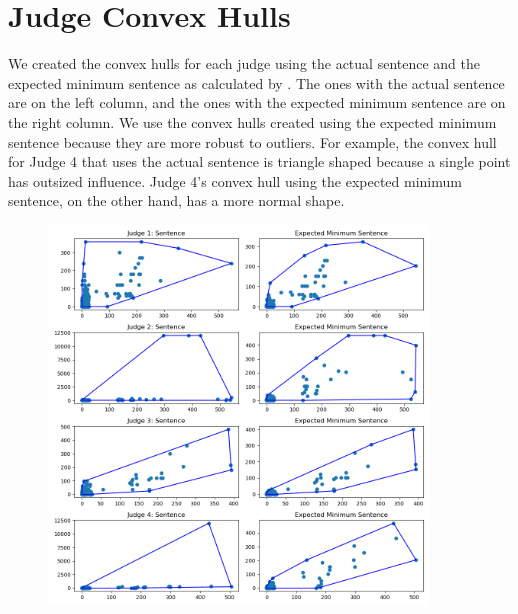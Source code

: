 \documentclass[11pt, oneside]{article}   	%
\theoremstyle{ModifiedStyle}
\begin{document}
		\section{Judge Convex Hulls}
		  \label{app-judge-convex-hulls}
		  We created the convex hulls for each judge using the actual sentence and the expected minimum sentence as calculated by \cite{hester2017conditional}. The ones with the actual sentence are on the left column, and the ones with the expected minimum sentence are on the right column. We use the convex hulls created using the expected minimum sentence because they are more robust to outliers. For example, the convex hull for Judge 4 that uses the actual sentence is triangle shaped because a single point has outsized influence. Judge 4's convex hull using the expected minimum sentence, on the other hand, has a more normal shape.
			\begin{figure}[H]
				\centering
				\includegraphics[width=0.9\textwidth]{../../output/figures/Exploration/judge_convex_hulls_0.png}
			\end{figure}
\end{document}
